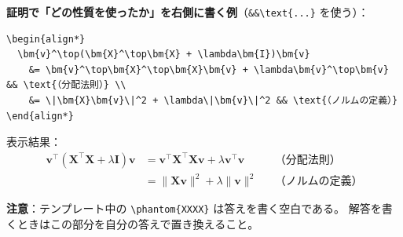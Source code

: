 \documentclass[a4paper,dvipdfmx]{jsarticle}
\newcommand{\提出期限}{2026年11月2日（月）}
\newcommand{\学籍番号}{0000000}
\newcommand{\氏名}{氏名を書く}
\newcommand{\提出日}{2026年11月2日}
\begin{document}
\noindent
\textbf{証明で「どの性質を使ったか」を右側に書く例}（\verb|&&\text{...}| を使う）：
\begin{verbatim}
\begin{align*}
  \bm{v}^\top(\bm{X}^\top\bm{X} + \lambda\bm{I})\bm{v}
    &= \bm{v}^\top\bm{X}^\top\bm{X}\bm{v} + \lambda\bm{v}^\top\bm{v} && \text{（分配法則）} \\
    &= \|\bm{X}\bm{v}\|^2 + \lambda\|\bm{v}\|^2 && \text{（ノルムの定義）}
\end{align*}
\end{verbatim}
表示結果：
\begin{align*}
  \bm{v}^\top(\bm{X}^\top\bm{X} + \lambda\bm{I})\bm{v}
    &= \bm{v}^\top\bm{X}^\top\bm{X}\bm{v} + \lambda\bm{v}^\top\bm{v} && \text{（分配法則）} \\
    &= \|\bm{X}\bm{v}\|^2 + \lambda\|\bm{v}\|^2 && \text{（ノルムの定義）}
\end{align*}

\noindent
\textbf{注意}：テンプレート中の \verb|\phantom{XXXX}| は答えを書く空白である。
解答を書くときはこの部分を自分の答えで置き換えること。
\end{document}
